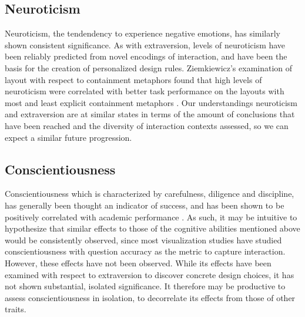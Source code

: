 \documentclass[conference]{IEEEtran}
\begin{document}
\subsection{Neuroticism}\label{Neuroticism}
Neuroticism, the tendendency to experience negative emotions, has similarly shown consistent
significance. As with extraversion, levels of neuroticism have been reliably predicted from
novel encodings of interaction\cite{Waldo}, and have been the basis for the creation of
personalized design rules\cite{SarsamFirstLook}. Ziemkiewicz's examination of layout with
respect to containment metaphors found that high levels of neuroticism were correlated with
better task performance on the layouts with most and least explicit containment metaphors
\cite{Ziemkiewicz}. Our understandings neuroticism and extraversion are at similar states
in terms of the amount of conclusions that have been reached and the diversity of interaction
contexts assessed, so we can expect a similar future progression.

\subsection{Conscientiousness}\label{Conscientiousness}
Conscientiousness which is characterized by carefulness, diligence and discipline, has generally
been thought an indicator of success, and has been shown to be positively correlated with
academic performance \cite{ImhofSpaet2013pv}. As such, it may be intuitive to hypothesize
that similar effects to those of the cognitive abilities mentioned above would be consistently
observed, since most visualization studies have studied conscientiousness with question
accuracy as the metric to capture interaction. However, these effects have not been observed.
While its effects have been examined with respect to extraversion \cite{SarsamFirstLook} to
discover concrete design choices, it has not shown substantial, isolated significance. It
therefore may be productive to assess conscientiousness in isolation, to decorrelate its
effects from those of other traits.
\end{document}
